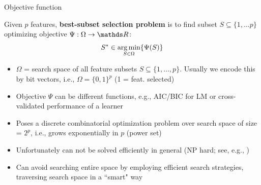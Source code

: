 \documentclass[11pt,compress,t,notes=noshow, xcolor=table]{beamer}
\begin{document}



  \begin{vbframe}{Objective function}


    Given $p$ features, \textbf{best-subset selection problem} is to find subset $S \subseteq \{ 1, \dots p \}$ optimizing objective $\Psi: \Omega \rightarrow \R$:
    \vspace{-0.15cm}
    $$S^{*}  \in \operatorname*{arg\,min}_{{S \in \Omega}} \{ \Psi(S) \}$$
    \vspace{-0.8cm}
    \begin{itemize}
    \setlength{\itemsep}{0.8em}
     \item $\Omega$  = search space of all feature subsets $S\subseteq\{ 1, \dots, p \}$. Usually we encode this by
      bit vectors, i.e., $\Omega = \{0, 1\}^p$ (1 = feat. selected)
     \item Objective $\Psi$ can be different functions, e.g., AIC/BIC for LM or cross-validated performance of a learner
     \item Poses a discrete combinatorial optimization problem over search space of size = $2^p$, i.e., grows exponentially in $p$ (power set)%
     \item Unfortunately can not be solved efficiently in general (NP hard; see, e.g., )
     \item Can avoid searching entire space by employing efficient search strategies, traversing search space in a ``smart" way %

    \end{itemize}

  \end{vbframe}
\end{document}
